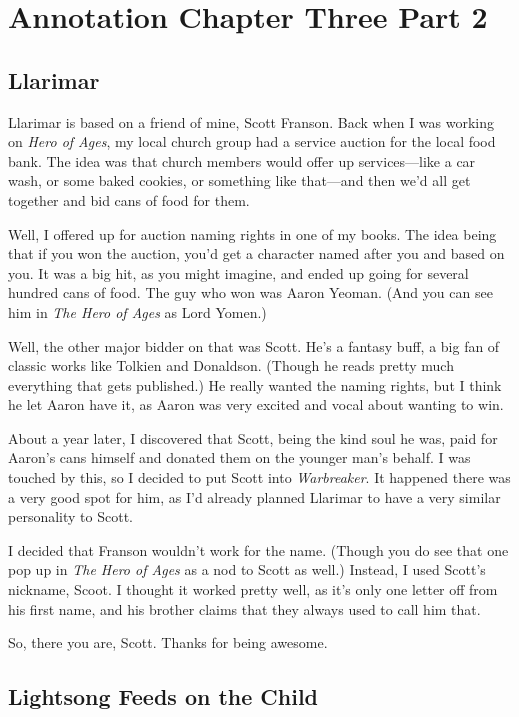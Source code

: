 \section{Annotation Chapter Three Part 2}

\subsection*{Llarimar}

Llarimar is based on a friend of mine, Scott Franson. Back when I was working on \textit{Hero of Ages}, my local church group had a service auction for the local food bank. The idea was that church members would offer up services—like a car wash, or some baked cookies, or something like that—and then we’d all get together and bid cans of food for them.

Well, I offered up for auction naming rights in one of my books. The idea being that if you won the auction, you’d get a character named after you and based on you. It was a big hit, as you might imagine, and ended up going for several hundred cans of food. The guy who won was Aaron Yeoman. (And you can see him in \textit{The Hero of Ages} as Lord Yomen.)

Well, the other major bidder on that was Scott. He’s a fantasy buff, a big fan of classic works like Tolkien and Donaldson. (Though he reads pretty much everything that gets published.) He really wanted the naming rights, but I think he let Aaron have it, as Aaron was very excited and vocal about wanting to win.

About a year later, I discovered that Scott, being the kind soul he was, paid for Aaron’s cans himself and donated them on the younger man’s behalf. I was touched by this, so I decided to put Scott into \textit{Warbreaker}. It happened there was a very good spot for him, as I’d already planned Llarimar to have a very similar personality to Scott.

I decided that Franson wouldn’t work for the name. (Though you do see that one pop up in \textit{The Hero of Ages} as a nod to Scott as well.) Instead, I used Scott’s nickname, Scoot. I thought it worked pretty well, as it’s only one letter off from his first name, and his brother claims that they always used to call him that.

So, there you are, Scott. Thanks for being awesome.

\subsection*{Lightsong Feeds on the Child}

